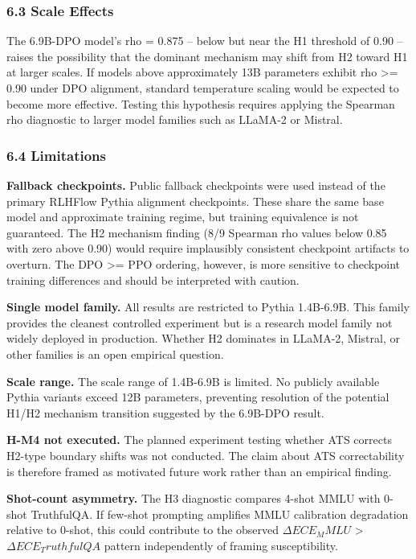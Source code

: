 \subsubsection{6.3 Scale Effects}

The 6.9B-DPO model's rho = 0.875 -- below but near the H1 threshold of 0.90 -- raises the possibility that the dominant mechanism may shift from H2 toward H1 at larger scales. If models above approximately 13B parameters exhibit rho >= 0.90 under DPO alignment, standard temperature scaling would be expected to become more effective. Testing this hypothesis requires applying the Spearman rho diagnostic to larger model families such as LLaMA-2 or Mistral.

\subsubsection{6.4 Limitations}

\textbf{Fallback checkpoints.} Public fallback checkpoints were used instead of the primary RLHFlow Pythia alignment checkpoints. These share the same base model and approximate training regime, but training equivalence is not guaranteed. The H2 mechanism finding (8/9 Spearman rho values below 0.85 with zero above 0.90) would require implausibly consistent checkpoint artifacts to overturn. The DPO >= PPO ordering, however, is more sensitive to checkpoint training differences and should be interpreted with caution.

\textbf{Single model family.} All results are restricted to Pythia 1.4B-6.9B. This family provides the cleanest controlled experiment but is a research model family not widely deployed in production. Whether H2 dominates in LLaMA-2, Mistral, or other families is an open empirical question.

\textbf{Scale range.} The scale range of 1.4B-6.9B is limited. No publicly available Pythia variants exceed 12B parameters, preventing resolution of the potential H1/H2 mechanism transition suggested by the 6.9B-DPO result.

\textbf{H-M4 not executed.} The planned experiment testing whether ATS corrects H2-type boundary shifts was not conducted. The claim about ATS correctability is therefore framed as motivated future work rather than an empirical finding.

\textbf{Shot-count asymmetry.} The H3 diagnostic compares 4-shot MMLU with 0-shot TruthfulQA. If few-shot prompting amplifies MMLU calibration degradation relative to 0-shot, this could contribute to the observed $\Delta ECE_MMLU$ > $\Delta ECE_TruthfulQA$ pattern independently of framing susceptibility.

